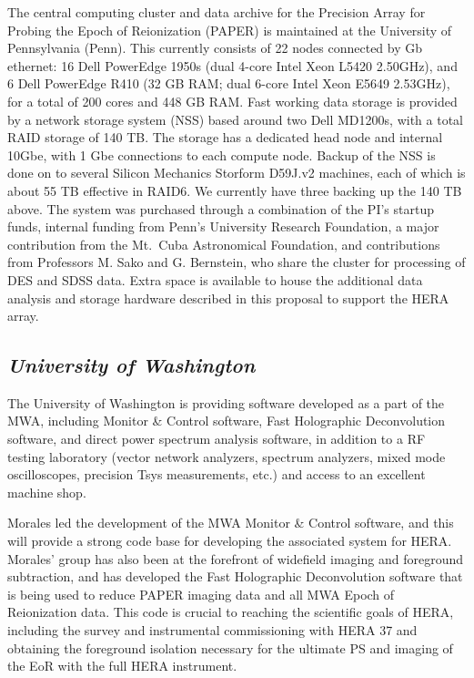\documentclass[11pt]{article}
\begin{document}
The central computing cluster and data archive for the Precision Array for Probing the Epoch of Reionization (PAPER) is maintained at the University of Pennsylvania (Penn).  This currently consists of 22 nodes connected by Gb ethernet: 16 Dell PowerEdge 1950s (dual 4-core Intel Xeon L5420 \@ 2.50GHz), and 6 Dell PowerEdge R410 (32 GB RAM; dual 6-core Intel Xeon E5649 \@ 2.53GHz), for a total of 200 cores and 448 GB RAM.  Fast working data storage is provided by a network storage system (NSS) based around two Dell MD1200s, with a total RAID storage of 140 TB.  The storage has a dedicated head node and internal 10Gbe, with 1 Gbe connections to each compute node. Backup of the NSS is done on to several Silicon Mechanics Storform D59J.v2 machines, each of which is about 55 TB effective in RAID6.  We currently have three backing up the 140 TB above. The system was purchased through a combination of the PI's startup funds, internal funding from Penn's University Research Foundation, a major contribution from the Mt.~Cuba Astronomical Foundation, and contributions from Professors M. Sako and G. Bernstein, who share the cluster for processing of DES and SDSS data.  Extra space is available to house the additional data analysis and storage hardware described in this proposal to support the HERA array.


\subsection{\it University of Washington}

The University of Washington is providing software developed as a part of the MWA, including Monitor \& Control software, Fast Holographic Deconvolution software, and direct power spectrum analysis software, in addition to a RF testing laboratory (vector network analyzers, spectrum analyzers, mixed mode oscilloscopes, precision Tsys measurements, etc.) and access to an excellent machine shop.

Morales led the development of the MWA Monitor \& Control software, and this will provide a strong code base for developing the associated system for HERA. Morales' group has also been at the forefront of widefield imaging and foreground subtraction, and has developed the Fast Holographic Deconvolution software that is being used to reduce PAPER imaging data and all MWA Epoch of Reionization data. This code is crucial to reaching the scientific goals of HERA, including the survey and instrumental commissioning with HERA 37 and obtaining the foreground isolation necessary for the ultimate PS and imaging of the EoR with the full HERA instrument.
\end{document}
